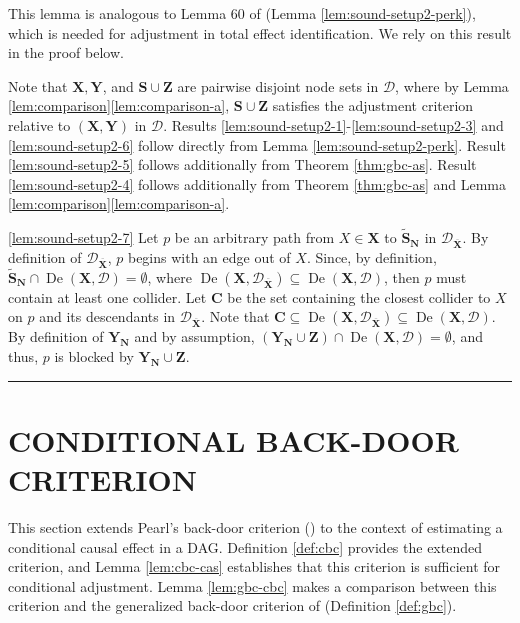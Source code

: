 \documentclass[twoside]{article}
\DeclareMathOperator{\De}{De}
\newcommand{\mb}[1]{\mathbf{#1}}
\newcommand{\g}[1][G]{\mathcal{#1}}
\newenvironment{proofof}[1][]{\begin{trivlist}
\item[\hskip \labelsep {\bfseries Proof of #1.}]}{\hfill\BlackBox\end{trivlist}}
\newcommand{\BlackBox}{\rule{1.5ex}{1.5ex}}
\begin{document}
\begin{proofof}[Lemma \ref{lem:sound-setup2}]
    This lemma is analogous to Lemma 60 of \cite{perkovic2018complete} (Lemma \ref{lem:sound-setup2-perk}), which is needed for adjustment in total effect identification. We rely on this result in the proof below.

    Note that $\mb{X,Y}$, and $\mb{S} \cup \mb{Z}$ are pairwise disjoint node sets in $\g[D]$, where by Lemma \ref{lem:comparison}\ref{lem:comparison-a}, $\mb{S} \cup \mb{Z}$ satisfies the adjustment criterion relative to $(\mb{X}, \mb{Y})$ in $\g[D]$. Results \ref{lem:sound-setup2-1}-\ref{lem:sound-setup2-3} and \ref{lem:sound-setup2-6} follow directly from Lemma \ref{lem:sound-setup2-perk}. Result \ref{lem:sound-setup2-5} follows additionally from Theorem \ref{thm:gbc-as}. Result \ref{lem:sound-setup2-4} follows additionally from Theorem \ref{thm:gbc-as} and Lemma \ref{lem:comparison}\ref{lem:comparison-a}.

    \ref{lem:sound-setup2-7} Let $p$ be an arbitrary path from $X \in \mb{X}$ to $\mb{\tilde{S}_N}$ in $\g[D]_{\overline{\mb{X}}}$. By definition of $\g[D]_{\overline{\mb{X}}}$, $p$ begins with an edge out of $X$. Since, by definition, $\mb{\tilde{S}_N} \cap \De(\mb{X},\g[D]) = \emptyset$, where $\De(\mb{X},\g[D]_{\overline{\mb{X}}}) \subseteq \De(\mb{X},\g[D])$, then $p$ must contain at least one collider. Let $\mb{C}$ be the set containing the closest collider to $X$ on $p$ and its descendants in $\g[D]_{\overline{\mb{X}}}$. Note that $\mb{C} \subseteq \De(\mb{X},\g[D]_{\overline{\mb{X}}}) \subseteq \De(\mb{X},\g[D])$. By definition of $\mb{Y_N}$ and by assumption, $(\mb{Y_N} \cup \mb{Z}) \cap \De(\mb{X},\g[D]) = \emptyset$, and thus, $p$ is blocked by $\mb{Y_N} \cup \mb{Z}$.
\end{proofof} 












\section{CONDITIONAL BACK-DOOR CRITERION}
\label{supp:backdoor}

This section extends Pearl's back-door criterion (\citeyear{pearl2009causality}) to the context of estimating a conditional causal effect in a DAG. Definition \ref{def:cbc} provides the extended criterion, and Lemma \ref{lem:cbc-cas} establishes that this criterion is sufficient for conditional adjustment. Lemma \ref{lem:gbc-cbc} makes a comparison between this criterion and the generalized back-door criterion of \cite{maathuis2015generalized} (Definition \ref{def:gbc}).
\end{document}
